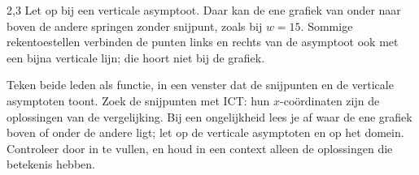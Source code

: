 \begin{alleenvoor}{2,3}
Let op bij een verticale asymptoot. Daar kan de ene grafiek van onder naar boven de andere springen zonder snijpunt, zoals bij $w = 15$. Sommige rekentoestellen verbinden de punten links en rechts van de asymptoot ook met een bijna verticale lijn; die hoort niet bij de grafiek.

\begin{werkwijze}
Teken beide leden als functie, in een venster dat de snijpunten en de verticale asymptoten toont. Zoek de snijpunten met ICT: hun $x$-coördinaten zijn de oplossingen van de vergelijking. Bij een ongelijkheid lees je af waar de ene grafiek boven of onder de andere ligt; let op de verticale asymptoten en op het domein. Controleer door in te vullen, en houd in een context alleen de oplossingen die betekenis hebben.
\end{werkwijze}

\begin{oefeningen}
\end{oefeningen}

\end{alleenvoor}
\opdrachtenkop

